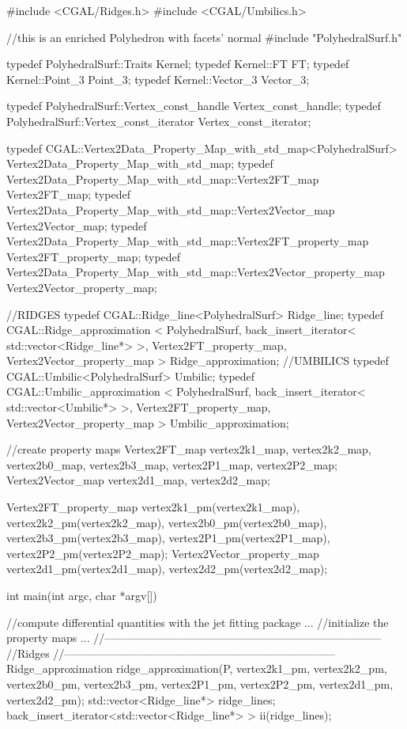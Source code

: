 \begin{ccExampleCode} 
#include <CGAL/Ridges.h> 
#include <CGAL/Umbilics.h>

//this is an enriched Polyhedron with facets' normal
#include "PolyhedralSurf.h"

typedef PolyhedralSurf::Traits          Kernel;
typedef Kernel::FT                      FT;
typedef Kernel::Point_3                 Point_3;
typedef Kernel::Vector_3                Vector_3;

typedef PolyhedralSurf::Vertex_const_handle   Vertex_const_handle;
typedef PolyhedralSurf::Vertex_const_iterator Vertex_const_iterator;
    
typedef CGAL::Vertex2Data_Property_Map_with_std_map<PolyhedralSurf> Vertex2Data_Property_Map_with_std_map;
typedef Vertex2Data_Property_Map_with_std_map::Vertex2FT_map Vertex2FT_map;
typedef Vertex2Data_Property_Map_with_std_map::Vertex2Vector_map Vertex2Vector_map;
typedef Vertex2Data_Property_Map_with_std_map::Vertex2FT_property_map Vertex2FT_property_map;
typedef Vertex2Data_Property_Map_with_std_map::Vertex2Vector_property_map Vertex2Vector_property_map;

//RIDGES
typedef CGAL::Ridge_line<PolyhedralSurf> Ridge_line;
typedef CGAL::Ridge_approximation < PolyhedralSurf,
				    back_insert_iterator< std::vector<Ridge_line*> >,
				    Vertex2FT_property_map,
				    Vertex2Vector_property_map > Ridge_approximation;
//UMBILICS
typedef CGAL::Umbilic<PolyhedralSurf> Umbilic;
typedef CGAL::Umbilic_approximation < PolyhedralSurf,
				      back_insert_iterator< std::vector<Umbilic*> >, 
				      Vertex2FT_property_map, 
				      Vertex2Vector_property_map > Umbilic_approximation;

//create property maps
Vertex2FT_map vertex2k1_map, vertex2k2_map, 
  vertex2b0_map, vertex2b3_map, 
  vertex2P1_map, vertex2P2_map;
Vertex2Vector_map vertex2d1_map, vertex2d2_map;

Vertex2FT_property_map vertex2k1_pm(vertex2k1_map), vertex2k2_pm(vertex2k2_map), 
  vertex2b0_pm(vertex2b0_map), vertex2b3_pm(vertex2b3_map), 
  vertex2P1_pm(vertex2P1_map), vertex2P2_pm(vertex2P2_map);
Vertex2Vector_property_map vertex2d1_pm(vertex2d1_map), vertex2d2_pm(vertex2d2_map);

int main(int argc, char *argv[])
{  
  //compute differential quantities with the jet fitting package
	...
  //initialize the property maps
	...
   //---------------------------------------------------------------------------
  //Ridges
  //--------------------------------------------------------------------------
  Ridge_approximation ridge_approximation(P, 
					  vertex2k1_pm, vertex2k2_pm,
					  vertex2b0_pm, vertex2b3_pm,
					  vertex2P1_pm, vertex2P2_pm,
					  vertex2d1_pm, vertex2d2_pm);
  std::vector<Ridge_line*> ridge_lines;
  back_insert_iterator<std::vector<Ridge_line*> > ii(ridge_lines);
  
}
\end{ccExampleCode}
